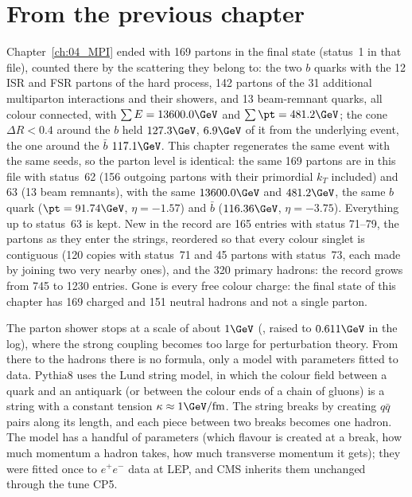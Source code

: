 \section{From the previous chapter}
Chapter~\ref{ch:04_MPI} ended with 169 partons in the final state (status~1 in that file), counted there by the
scattering they belong to: the two $b$ quarks with the 12 ISR and FSR partons of the hard process, 142 partons of
the 31 additional multiparton interactions and their showers, and 13 beam-remnant quarks, all colour connected,
with $\sum E=13600.0\GeV$ and $\sum\pt=481.2\GeV$; the cone $\Delta R<0.4$ around the $b$ held $127.3\GeV$,
$6.9\GeV$ of it from the underlying event, the one around the $\bar b$ $117.1\GeV$. This chapter regenerates the same event with the same seeds,
so the parton level is identical: the same 169 partons are in this file with status~62 (156 outgoing
partons with their primordial $k_T$ included) and 63 (13 beam remnants), with the same $13600.0\GeV$ and
$481.2\GeV$, the same $b$ quark ($\pt=91.74\GeV$, $\eta=-1.57$) and $\bar b$ ($116.36\GeV$, $\eta=-3.75$).
Everything up to status~63 is kept. New in the record are 165 entries with status 71--79, the partons as they
enter the strings, reordered so that every colour singlet is contiguous (120 copies with status~71 and 45 partons
with status~73, each made by joining two very nearby ones), and the 320
primary hadrons: the record grows from 745 to 1230 entries. Gone is every free colour charge: the final
state of this chapter has 169 charged and 151 neutral hadrons and not a single parton.

\begin{plainwords}
The parton shower stops at a scale of about $1\GeV$ (, raised to $0.611\GeV$ in the
log), where the strong coupling becomes too large for perturbation theory. From there to the hadrons there
is no formula, only a model with parameters fitted to data. Pythia8 uses the Lund string model, in which the colour field between a quark and an antiquark (or between the colour
ends of a chain of gluons) is a string with a constant tension $\kappa\approx1\GeV/\mathrm{fm}$. The string
breaks by creating $q\bar q$ pairs along its length, and each piece between two breaks becomes one hadron.
The model has a handful of parameters (which flavour is created at a break, how much momentum a hadron
takes, how much transverse momentum it gets); they were fitted once to $e^+e^-$ data at LEP, and CMS
inherits them unchanged through the tune CP5.
\end{plainwords}

